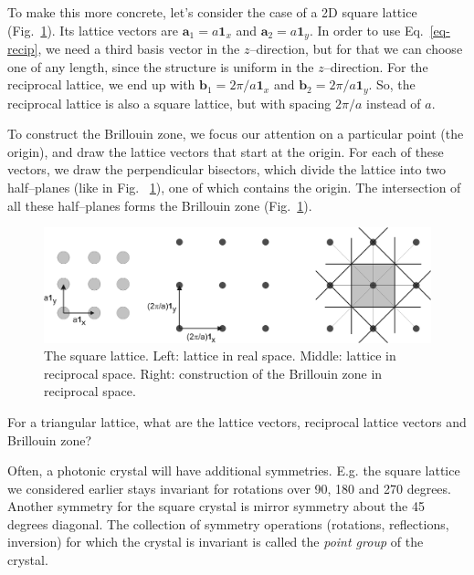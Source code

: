 To make this more concrete, let's consider the case of a 2D square lattice (Fig.~\ref{fig-bril-square}). Its lattice vectors are ${\mathbf a}_1 = a {\mathbf 1}_x$ and ${\mathbf a}_2 = a {\mathbf 1}_y$. In order to use Eq.~\ref{eq-recip}, we need a third basis vector in the $z$--direction, but for that we can choose one of any length, since the structure is uniform in the $z$--direction. For the reciprocal lattice, we end up with  ${\mathbf b}_1 = 2 \pi / a {\mathbf 1}_x$ and ${\mathbf b}_2 = 2 \pi / a {\mathbf 1}_y$. So, the reciprocal lattice is also a square lattice, but with spacing $2 \pi / a$ instead of $a$.

To construct the Brillouin zone, we focus our attention on a particular point (the origin), and draw the lattice vectors that start at the origin. For each of these vectors, we draw the perpendicular bisectors, which divide the lattice into two half--planes (like in Fig.~ \ref{fig-bril-square}), one of which contains the origin. The intersection of all these half--planes forms the Brillouin zone (Fig.~\ref{fig-bril-square}).

\begin{figure}
\centering
\includegraphics{symmetry/figures/brillouin_square}
\caption{The square lattice. Left: lattice in real space. Middle: lattice in reciprocal space. Right: construction of the Brillouin zone in reciprocal space.}
\label{fig-bril-square}
\end{figure}


\begin{exer}
For a triangular lattice, what are the lattice vectors, reciprocal lattice vectors and Brillouin zone?
\end{exer}

\pagebreak
 

Often, a photonic crystal will have additional symmetries. E.g. the square lattice we considered earlier stays invariant for rotations over 90, 180 and 270 degrees. Another symmetry for the square crystal is mirror symmetry about the 45 degrees diagonal. The collection of symmetry operations (rotations, reflections, inversion) for which the crystal is invariant is called the \emph{point group} of the crystal.


